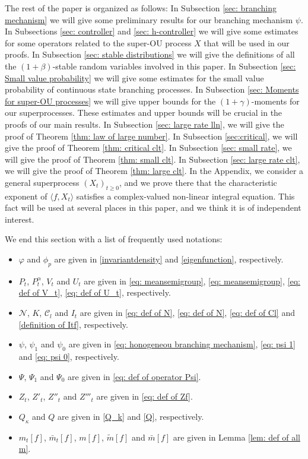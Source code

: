 \documentclass[12pt,a4paper]{amsart}
\theoremstyle{plain}
\theoremstyle{definition}
\numberwithin{equation}{section}
\begin{document}
    The rest of the paper is organized as follows: In Subsection \ref{sec: branching mechanism} we will give some preliminary results for our branching mechanism $\psi$.
    In Subsections \ref{sec: controller} and \ref{sec: h-controller} we will give some estimates for some operators related to the super-OU process $X$ that will be used in our proofs.
    In Subsection \ref{sec: stable distributions} we will give the definitions of all the $(1+\beta)$-stable random variables involved in this paper.
    In Subsection \ref{sec: Small value probability} we will give some estimates for the small value probability of continuous state branching processes. In Subsection \ref{sec: Moments for super-OU processes} we will give upper bounds for the $(1+\gamma)$-moments for our superprocesses.
    These estimates and upper bounds will be crucial in the proofs of our main results.
    In Subsection \ref{sec: large rate lln}, we will give the proof of Theorem \ref{thm: law of large number}.
    In Subsection \ref{sec:critical}, we will give the proof of Theorem \ref{thm: critical clt}.
    In Subsection \ref{sec: small rate}, we will give the proof of Theorem \ref{thm: small clt}.
    In Subsection \ref{sec: large rate clt}, we will give the proof of Theorem \ref{thm: large clt}.
    In the Appendix, we consider a general superprocess $(X_t)_{t\geq 0}$, and we prove there that the characteristic exponent of $\langle f,X_t\rangle$ satisfies a complex-valued non-linear integral equation.
    This fact will be used at several places in this paper, and we think it is of independent interest.

    We end this section with a list of frequently used notations:
\begin{itemize}
\item
    $\varphi$ and $\phi_p$ are given 
    in \eqref{invariantdensity} and \eqref{eigenfunction}, respectively.
\item
    $P_t$, $P^\alpha_t$, $V_t$ and $U_t$ are given 
   in \eqref{eq: meansemigroup}, \eqref{eq: meansemigroup}, 
    \eqref{eq: def of V_t}, \eqref{eq: def of U_t}, respectively.
\item
    $\mathcal N$, $K$, $\mathcal C_l$ and $I_t$ are given 
    in \eqref{eq: def of N}, \eqref{eq: def of N},  \eqref{eq: def of Cl} and 
    \eqref{definition of Itf}, respectively.
\item
    $\psi$, $\psi_1$ and $\psi_0$ are given 
    in \eqref{eq: honogeneou branching mechanism}, \eqref{eq: psi 1} and 
    \eqref{eq: psi 0}, respectively.
\item
   $\Psi$, $\Psi_1$ and $\Psi_0$ are given in \eqref{eq: def of operator Psi}.
\item
    $Z_t$, $Z'_t$, $Z''_t$ and $Z'''_t$ are given in \eqref{eq: def of Zf}.
\item
    $Q_\kappa$ and $Q$ are given in \eqref{Q_k} and \eqref{Q}, respectively.
\item
    $m_t[f]$, $\bar m_t[f]$, $m[f]$, 
   $\widetilde m[f]$ 
   and $\bar m[f]$ are given in Lemma \ref{lem: def of all m}.
\end{itemize}
\end{document}
